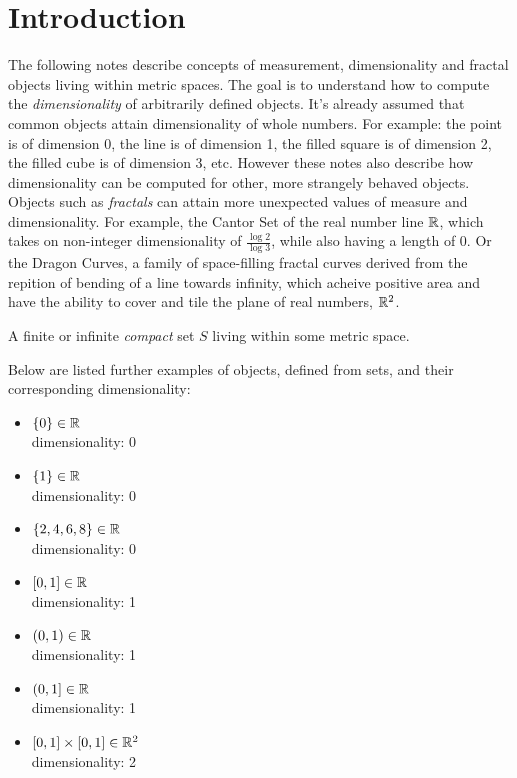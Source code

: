\documentclass[11pt]{ekblite}
\begin{document}
\section{Introduction}
The following notes describe concepts of measurement, dimensionality and fractal objects living within metric spaces. The goal is to understand how to compute the \textit{dimensionality} of arbitrarily defined objects. It's already assumed that common objects attain dimensionality of whole numbers. For example: the point is of dimension 0, the line is of dimension 1, the filled square is of dimension 2, the filled cube is of dimension 3, etc. However these notes also describe how dimensionality can be computed for other, more strangely behaved objects. Objects such as \textit{fractals} can attain more unexpected values of measure and dimensionality. For example, the Cantor Set of the real number line $\mathbb{R}$, which takes on non-integer dimensionality of $\frac{\log 2}{\log 3}$, while also having a length of 0. Or the Dragon Curves, a family of space-filling fractal curves derived from the repition of bending of a line towards infinity, which acheive positive area and have the ability to cover and tile the plane of real numbers, $\mathbb{R}^2$.
\begin{definition}[Object]
	A finite or infinite \textit{compact} set $S$ living within some metric space.
\end{definition}
Below are listed further examples of objects, defined from sets, and their corresponding dimensionality:
\begin{itemize}
	\item $\{0\} \in \mathbb{R}$ \\[0.1in] dimensionality: 0
	\item $\{1\} \in \mathbb{R}$ \\[0.1in] dimensionality: 0
	\item $\{2,4,6,8\} \in \mathbb{R}$ \\[0.1in] dimensionality: 0
	\item $[0,1] \in \mathbb{R}$ \\[0.1in] dimensionality: 1
	\item $(0,1) \in \mathbb{R}$ \\[0.1in] dimensionality: 1
	\item $(0,1] \in \mathbb{R}$ \\[0.1in] dimensionality: 1
	\item  $[0,1] \times [0,1] \in \mathbb{R}^2$ \\[0.1in] dimensionality: 2
\end{itemize}
\end{document}
